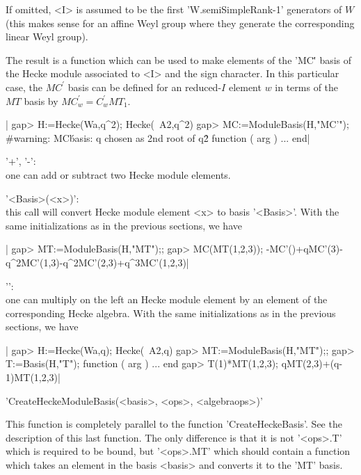 If  omitted,  <I>  is  assumed to  be  the  first  'W.semiSimpleRank-1'
generators of $W$ (this makes sense for an affine Weyl group where they
generate the corresponding linear Weyl group).

The result  is a  function which can  be used to  make elements  of the
'MC\''  basis of  the  Hecke  module associated  to  <I>  and the  sign
character.  In  this particular  case,  the  $MC^\prime$ basis  can  be
defined for  an reduced-$I$ element $w$  in terms of the  $MT$ basis by
$MC^\prime_w=C^\prime_w MT_1$.

|    gap> H:=Hecke(Wa,q^2);
    Hecke(~A2,q^2)
    gap> MC:=ModuleBasis(H,"MC'");
    #warning: MC\' basis: q chosen as 2nd root of q\^2
    function ( arg ) ... end|



'+', '-':\\ one can add or subtract two Hecke module elements.

'<Basis>(<x>)':\\ this  call will convert  Hecke module element  <x> to
basis  '<Basis>'. With  the  same initializations  as  in the  previous
sections, we have\:

|    gap> MT:=ModuleBasis(H,"MT");;
    gap> MC(MT(1,2,3));
    -MC'()+qMC'(3)-q^2MC'(1,3)-q^2MC'(2,3)+q^3MC'(1,2,3)|

'\*':\\  one  can  multiply  on   the  left  an  Hecke  module  element
by  an  element of  the  corresponding  Hecke  algebra. With  the  same
initializations as in the previous sections, we have\:

|    gap> H:=Hecke(Wa,q);
    Hecke(~A2,q)
    gap> MT:=ModuleBasis(H,"MT");;
    gap> T:=Basis(H,"T");
    function ( arg ) ... end
    gap> T(1)*MT(1,2,3);
    qMT(2,3)+(q-1)MT(1,2,3)|



'CreateHeckeModuleBasis(<basis>, <ops>, <algebraops>)'

This function is completely parallel to the function 'CreateHeckeBasis'.
See the description  of this last function. The only  difference is that
it is not '<ops>.T' which is  required to be bound, but '<ops>.MT' which
should contain  a function which takes  an element in the  basis <basis>
and converts it to the 'MT' basis.

